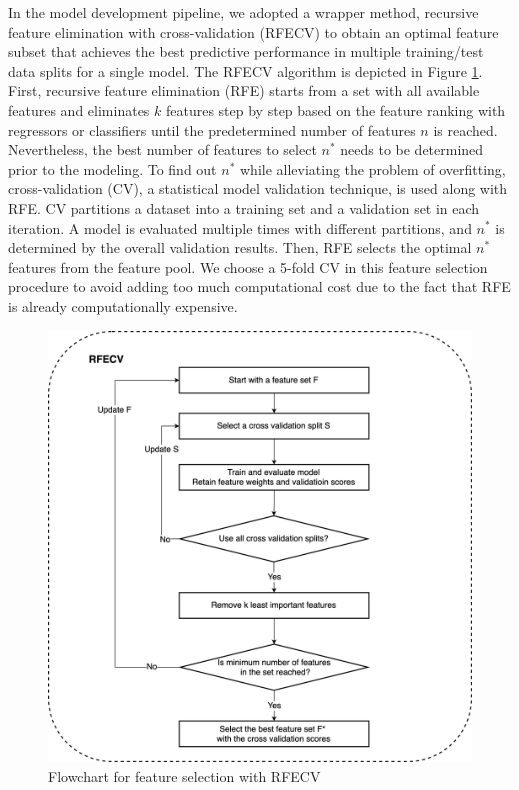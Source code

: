 In the model development pipeline, we adopted a wrapper method, recursive feature elimination with cross-validation (RFECV) to obtain an optimal feature subset that achieves the best predictive performance in multiple training/test data splits for a single model. The RFECV algorithm is depicted in Figure \ref{fig: rfecv}. First, recursive feature elimination (RFE) starts from a set with all available features and eliminates $k$ features step by step based on the feature ranking with regressors or classifiers until the predetermined number of features $n$ is reached. Nevertheless, the best number of features to select $n^*$ needs to be determined prior to the modeling. To find out $n^*$ while alleviating the problem of overfitting, cross-validation (CV), a statistical model validation technique, is used along with RFE. CV partitions a dataset into a training set and a validation set in each iteration. A model is evaluated multiple times with different partitions, and $n^*$ is determined by the overall validation results. Then, RFE selects the optimal $n^*$ features from the feature pool. We choose a 5-fold CV in this feature selection procedure to avoid adding too much computational cost due to the fact that RFE is already computationally expensive.

\begin{figure}[tb]
    \centering
    \includegraphics[width=0.9\linewidth]{fig/rfecv.png}
    \caption{Flowchart for feature selection with RFECV}
    \label{fig: rfecv}
\end{figure}

